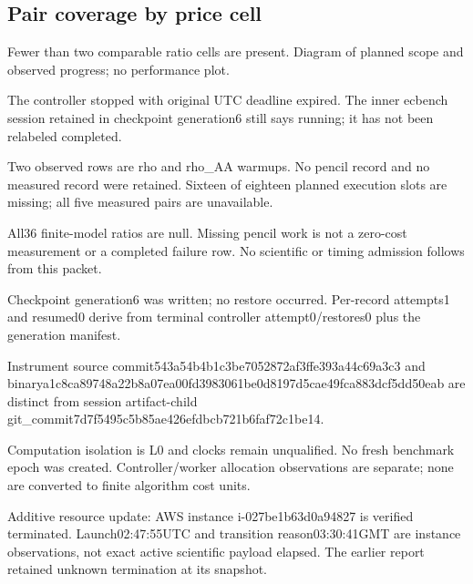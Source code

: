 \documentclass[10pt]{article}
\begin{document}
\subsection*{Pair coverage by price cell}
\par
Fewer than two comparable ratio cells are present. Diagram of planned scope and observed progress; no performance plot.\par
The controller stopped with original UTC deadline expired. The inner ecbench session retained in checkpoint generation6 still says running; it has not been relabeled completed.\par
Two observed rows are rho and rho\_AA warmups. No pencil record and no measured record were retained. Sixteen of eighteen planned execution slots are missing; all five measured pairs are unavailable.\par
All36 finite-model ratios are null. Missing pencil work is not a zero-cost measurement or a completed failure row. No scientific or timing admission follows from this packet.\par
Checkpoint generation6 was written; no restore occurred. Per-record attempts1 and resumed0 derive from terminal controller attempt0/restores0 plus the generation manifest.\par
Instrument source commit543a54b4b1c3be7052872af3ffe393a44c69a3c3 and binarya1c8ca89748a22b8a07ea00fd3983061be0d8197d5cae49fca883dcf5dd50eab are distinct from session artifact-child git\_commit7d7f5495c5b85ae426efdbcb721b6faf72c1be14.\par
Computation isolation is L0 and clocks remain unqualified. No fresh benchmark epoch was created. Controller/worker allocation observations are separate; none are converted to finite algorithm cost units.\par
Additive resource update: AWS instance i-027be1b63d0a94827 is verified terminated. Launch02:47:55UTC and transition reason03:30:41GMT are instance observations, not exact active scientific payload elapsed. The earlier report retained unknown termination at its snapshot.\par
\end{document}
